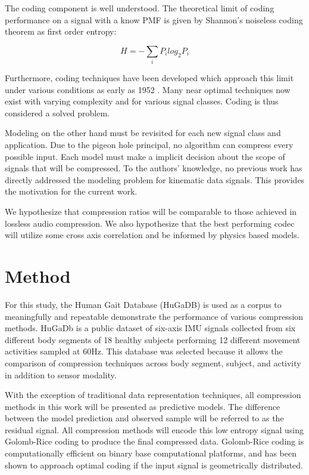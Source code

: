 \documentclass[journal]{IEEEtran}
\begin{document}
The coding component is well understood. The theoretical limit of coding performance on a signal with a know PMF is given by Shannon's noiseless coding theorem\cite{Shannon1948} as first order entropy:

$$H = -\sum_{i} P_ilog_2P_i$$

Furthermore, coding techniques have been developed which approach this limit under various conditions as early as 1952 \cite{Huffman1952}. Many near optimal techniques now exist with varying complexity and for various signal classes. Coding is thus considered a solved problem.

Modeling on the other hand must be revisited for each new signal class and application. Due to the pigeon hole principal, no algorithm can compress every possible input. Each model must make a implicit decision about the scope of signals that will be compressed. To the authors' knowledge, no previous work has directly addressed the modeling problem for kinematic data signals. This provides the motivation for the current work.

We hypothesize that compression ratios will be comparable to those achieved in lossless audio compression. We also hypothesize that the best performing codec will utilize some cross axis correlation and be informed by physics based models.

\section{Method}
For this study, the Human Gait Database (HuGaDB)\cite{Chereshnev2018} is used as a corpus to meaningfully and repeatable demonstrate the performance of various compression methods. HuGaDb is a public dataset of six-axis IMU signals collected from six different body segments of 18 healthy subjects performing 12 different movement activities sampled at 60Hz. This database was selected because it allows the comparison of compression techniques across body segment, subject, and activity in addition to sensor modality.

With the exception of traditional data representation techniques, all compression methods in this work will be presented as predictive models. The difference between the model prediction and observed sample will be referred to as the residual signal. All compression methods will encode this low entropy signal using Golomb-Rice coding to produce the final compressed data. Golomb-Rice coding is computationally efficient on binary base computational platforms, and has been shown to approach optimal coding if the input signal is geometrically distributed\cite{Golomb1966}\cite{F.Rice1979}.
\end{document}
